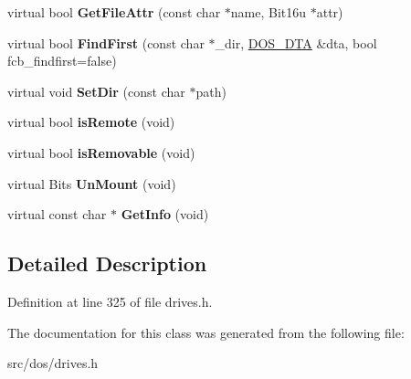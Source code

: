 \begin{DoxyCompactItemize}
\item 
\hypertarget{classphysfscdromDrive_ab912fc3e100db700805d05cd06716630}{virtual bool {\bfseries Get\-File\-Attr} (const char $\ast$name, Bit16u $\ast$attr)}\label{classphysfscdromDrive_ab912fc3e100db700805d05cd06716630}

\item 
\hypertarget{classphysfscdromDrive_ae13118f6b51622e933dc536ecea57258}{virtual bool {\bfseries Find\-First} (const char $\ast$\-\_\-dir, \hyperlink{classDOS__DTA}{D\-O\-S\-\_\-\-D\-T\-A} \&dta, bool fcb\-\_\-findfirst=false)}\label{classphysfscdromDrive_ae13118f6b51622e933dc536ecea57258}

\item 
\hypertarget{classphysfscdromDrive_ac73dc48b4346379edcdc2c42c502380a}{virtual void {\bfseries Set\-Dir} (const char $\ast$path)}\label{classphysfscdromDrive_ac73dc48b4346379edcdc2c42c502380a}

\item 
\hypertarget{classphysfscdromDrive_a39c3bc30452a8ecea465111831e5e7a6}{virtual bool {\bfseries is\-Remote} (void)}\label{classphysfscdromDrive_a39c3bc30452a8ecea465111831e5e7a6}

\item 
\hypertarget{classphysfscdromDrive_a2fd25800d56f447a0ec1550ec90a24ff}{virtual bool {\bfseries is\-Removable} (void)}\label{classphysfscdromDrive_a2fd25800d56f447a0ec1550ec90a24ff}

\item 
\hypertarget{classphysfscdromDrive_a99c7363ec5b3a0ca597c10e4f6dc2ecc}{virtual Bits {\bfseries Un\-Mount} (void)}\label{classphysfscdromDrive_a99c7363ec5b3a0ca597c10e4f6dc2ecc}

\item 
\hypertarget{classphysfscdromDrive_ad222bd4e5f133f63e2dd3713384298b8}{virtual const char $\ast$ {\bfseries Get\-Info} (void)}\label{classphysfscdromDrive_ad222bd4e5f133f63e2dd3713384298b8}

\end{DoxyCompactItemize}


\subsection{Detailed Description}


Definition at line 325 of file drives.\-h.



The documentation for this class was generated from the following file\-:\begin{DoxyCompactItemize}
\item 
src/dos/drives.\-h\end{DoxyCompactItemize}
